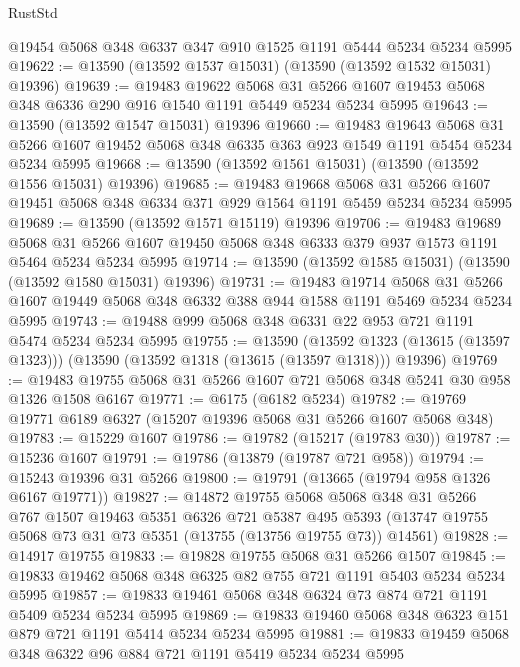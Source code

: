\begin{lexlean}{RustStd}
\begin{coremodule}
    @19454
    @5068
    @348
    @6337
    @347
    @910
    @1525
    @1191
    @5444
    @5234
    @5234
    @5995
@19622 := @13590 (@13592 @1537 @15031) (@13590 (@13592 @1532 @15031) @19396)
@19639 := @19483
    @19622
    @5068
    @31
    @5266
    @1607
    @19453
    @5068
    @348
    @6336
    @290
    @916
    @1540
    @1191
    @5449
    @5234
    @5234
    @5995
@19643 := @13590 (@13592 @1547 @15031) @19396
@19660 := @19483
    @19643
    @5068
    @31
    @5266
    @1607
    @19452
    @5068
    @348
    @6335
    @363
    @923
    @1549
    @1191
    @5454
    @5234
    @5234
    @5995
@19668 := @13590 (@13592 @1561 @15031) (@13590 (@13592 @1556 @15031) @19396)
@19685 := @19483
    @19668
    @5068
    @31
    @5266
    @1607
    @19451
    @5068
    @348
    @6334
    @371
    @929
    @1564
    @1191
    @5459
    @5234
    @5234
    @5995
@19689 := @13590 (@13592 @1571 @15119) @19396
@19706 := @19483
    @19689
    @5068
    @31
    @5266
    @1607
    @19450
    @5068
    @348
    @6333
    @379
    @937
    @1573
    @1191
    @5464
    @5234
    @5234
    @5995
@19714 := @13590 (@13592 @1585 @15031) (@13590 (@13592 @1580 @15031) @19396)
@19731 := @19483
    @19714
    @5068
    @31
    @5266
    @1607
    @19449
    @5068
    @348
    @6332
    @388
    @944
    @1588
    @1191
    @5469
    @5234
    @5234
    @5995
@19743 := @19488 @999 @5068 @348 @6331 @22 @953 @721 @1191 @5474 @5234 @5234 @5995
@19755 := @13590
    (@13592 @1323 (@13615 (@13597 @1323)))
    (@13590 (@13592 @1318 (@13615 (@13597 @1318))) @19396)
@19769 := @19483 @19755 @5068 @31 @5266 @1607 @721 @5068 @348 @5241 @30 @958 @1326 @1508 @6167
@19771 := @6175 (@6182 @5234)
@19782 := @19769 @19771 @6189 @6327 (@15207 @19396 @5068 @31 @5266 @1607 @5068 @348)
@19783 := @15229 @1607
@19786 := @19782 (@15217 (@19783 @30))
@19787 := @15236 @1607
@19791 := @19786 (@13879 (@19787 @721 @958))
@19794 := @15243 @19396 @31 @5266
@19800 := @19791 (@13665 (@19794 @958 @1326 @6167 @19771))
@19827 := @14872
    @19755
    @5068
    @5068
    @348
    @31
    @5266
    @767
    @1507
    @19463
    @5351
    @6326
    @721
    @5387
    @495
    @5393
    (@13747 @19755 @5068 @73 @31 @73 @5351 (@13755 (@13756 @19755 @73)) @14561)
@19828 := @14917 @19755
@19833 := @19828 @19755 @5068 @31 @5266 @1507
@19845 := @19833 @19462 @5068 @348 @6325 @82 @755 @721 @1191 @5403 @5234 @5234 @5995
@19857 := @19833 @19461 @5068 @348 @6324 @73 @874 @721 @1191 @5409 @5234 @5234 @5995
@19869 := @19833 @19460 @5068 @348 @6323 @151 @879 @721 @1191 @5414 @5234 @5234 @5995
@19881 := @19833 @19459 @5068 @348 @6322 @96 @884 @721 @1191 @5419 @5234 @5234 @5995

\end{coremodule}
\end{lexlean}
